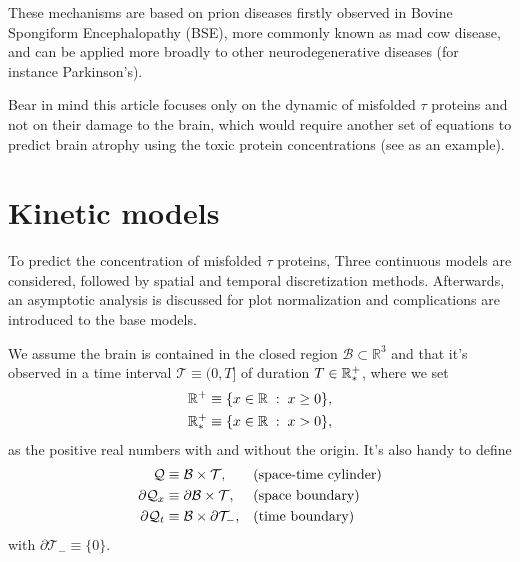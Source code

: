 \documentclass{article}
\begin{document}
        These mechanisms are based on prion diseases firstly observed in Bovine Spongiform Encephalopathy (BSE), more commonly known as mad cow disease, and can be applied more broadly to other neurodegenerative diseases (for instance Parkinson's).

        Bear in mind this article focuses only on the dynamic of misfolded $\tau$ proteins and not on their damage to the brain, which would require another set of equations to predict brain atrophy using the toxic protein concentrations (see \cite{Bertsch2016} as an example).




    \section{Kinetic models} \label{secKineticModels}

        To predict the concentration of misfolded $\tau$ proteins, Three continuous models are considered, followed by spatial and temporal discretization methods. Afterwards, an asymptotic analysis is discussed for plot normalization and complications are introduced to the base models.

        We assume the brain is contained in the closed region $\mathcal B\subset\mathbb R^3$ and that it's observed in a time interval $\mathcal T\equiv(0,T]$ of duration $T\in\mathbb R_*^+$, where we set
        \begin{equation} %
            \begin{aligned}
                \RPlus&\equiv\{x\in\mathbb R\;:\;x\ge0\},\\
                \RPlusStar&\equiv\{x\in\mathbb R\;:\;x>0\},
            \end{aligned}
            \label{eqRplusRplusStar}
        \end{equation}
        as the positive real numbers with and without the origin. It's also handy to define
        \begin{equation}
            \begin{alignedat}{2}
                \mathcal Q&\equiv\mathcal B\times\mathcal T,
                &\quad&\text{(space-time cylinder)}\\
                \partial\mathcal Q_x&\equiv\partial\mathcal B\times\mathcal T,
                &\quad&\text{(space boundary)}\\
                \partial\mathcal Q_t&\equiv\mathcal B\times\partial\mathcal T_-,
                &\quad&\text{(time boundary)}
            \end{alignedat}
            \label{eqSpaceTimeCylinderSets}
        \end{equation}
        with $\partial\mathcal T_-\equiv\{0\}$. 
\end{document}
